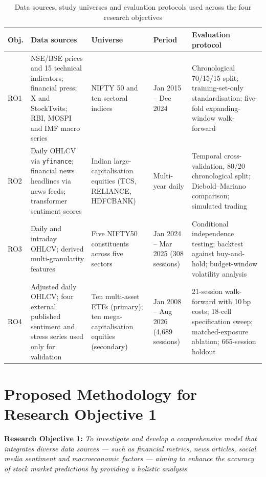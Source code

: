 \begin{table}[!htb]
\centering
\caption[Data sources, universes and evaluation protocols]{Data sources, study universes and evaluation protocols used across the four
research objectives}
\label{tab:data}
\tabfont
\begin{tabular}{@{}L{1.1cm}L{3.3cm}L{3.0cm}L{2.5cm}L{4.2cm}@{}}
\toprule
\textbf{Obj.} & \textbf{Data sources} & \textbf{Universe} & \textbf{Period} &
\textbf{Evaluation protocol} \\
\midrule
RO1 & NSE/BSE prices and 15 technical indicators; financial press; X and StockTwits;
RBI, MOSPI and IMF macro series & NIFTY 50 and ten sectoral indices & Jan 2015 --
Dec 2024 & Chronological 70/15/15 split; training-set-only standardisation; five-fold
expanding-window walk-forward \\
RO2 & Daily OHLCV via \texttt{yfinance}; financial news headlines via news feeds;
transformer sentiment scores & Indian large-capitalisation equities (TCS, RELIANCE,
HDFCBANK) & Multi-year daily & Temporal cross-validation, 80/20 chronological split;
Diebold--Mariano comparison; simulated trading \\
RO3 & Daily and intraday OHLCV; derived multi-granularity features & Five NIFTY50
constituents across five sectors & Jan 2024 -- Mar 2025 (308 sessions) & Conditional
independence testing; backtest against buy-and-hold; budget-window volatility analysis \\
RO4 & Adjusted daily OHLCV; four external published sentiment and stress series used
only for validation & Ten multi-asset ETFs (primary); ten mega-capitalisation equities
(secondary) & Jan 2008 -- Aug 2026 (4{,}689 sessions) & 21-session walk-forward with
10\,bp costs; 18-cell specification sweep; matched-exposure ablation; 665-session
holdout \\
\bottomrule
\end{tabular}
\end{table}

\section{Proposed Methodology for Research Objective 1}

\textbf{Research Objective 1:} \emph{To investigate and develop a comprehensive model
that integrates diverse data sources --- such as financial metrics, news articles, social
media sentiment and macroeconomic factors --- aiming to enhance the accuracy of stock
market predictions by providing a holistic analysis.}

